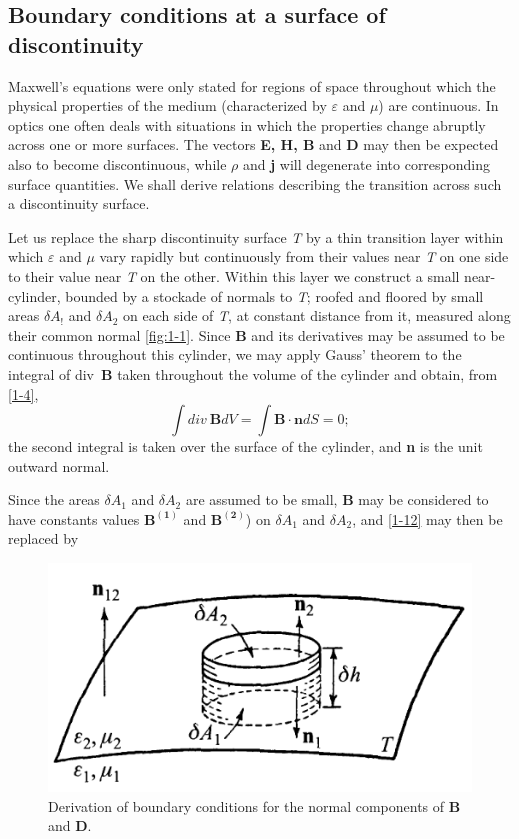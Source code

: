 \documentclass[lang=en,11pt]{elegantbook}
\begin{document}
	\subsection{Boundary conditions at a surface of discontinuity}
	Maxwell's equations were only stated for regions of space throughout which the physical properties of the medium (characterized by $\varepsilon$ and $\mu$) are continuous. In optics one often deals with situations in which the properties change abruptly across one or more surfaces. The vectors \textbf{E, H, B} and \textbf{D} may then be expected also to become discontinuous, while $\rho$ and \textbf{j} will degenerate into corresponding surface quantities. We shall derive relations describing the transition across such a discontinuity surface.\par
	Let us replace the sharp discontinuity surface \textit{T} by a thin transition layer within which $\varepsilon$ and $\mu$ vary rapidly but continuously from their values near \textit{T} on one side to their value near \textit{T} on the other. Within this layer we construct a small near-cylinder, bounded by a stockade of normals to \textit{T}; roofed and floored by small areas $\delta A_!$ and $\delta A_2$ on each side of \textit{T}, at constant distance from it, measured along their common normal \eqref{fig:1-1}. Since \textbf{B} and its derivatives may be assumed to be continuous throughout this cylinder, we may apply Gauss' theorem to the integral of div\ \textbf{B} taken throughout the volume of the cylinder and obtain, from \eqref{1-4},
	\begin{equation}
	\int div\ \mathbf{B}dV=\int\mathbf{B\cdot n}dS=0;
	\label{1-12}
	\end{equation}
	the second integral is taken over the surface of the cylinder, and \textbf{n} is the unit outward normal.\par
	Since the areas $\delta A_1$ and $\delta A_2$ are assumed to be small, \textbf{B} may be considered to have constants values $\mathbf{B^{(1)}}$ and $\mathbf{B^{(2)}}$) on $\delta A_1$ and $\delta A_2$, and \eqref{1-12} may then be replaced by
	\begin{figure}[htp!]
		\centering
		\includegraphics[scale=0.5]{image/fig1-1.png}
		\caption{Derivation of boundary conditions for the normal components of \textbf{B} and \textbf{D}.}
		\label{fig:1-1}
	\end{figure}
\end{document}

